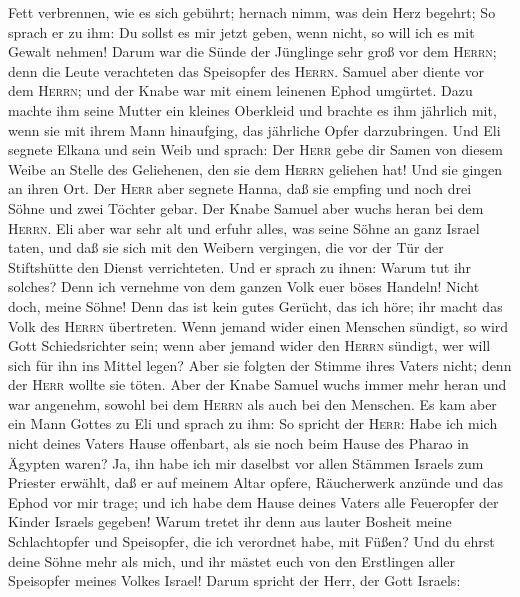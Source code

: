 Fett verbrennen, wie es sich gebührt; hernach nimm, was dein Herz
begehrt; So sprach er zu ihm: Du sollst es mir jetzt geben, wenn nicht,
so will ich es mit Gewalt nehmen!  Darum war die Sünde
der Jünglinge sehr groß vor dem \textsc{Herrn}; denn die Leute
verachteten das Speisopfer des \textsc{Herrn}.  Samuel
aber diente vor dem \textsc{Herrn}; und der Knabe war mit einem leinenen
Ephod umgürtet.  Dazu machte ihm seine Mutter ein kleines
Oberkleid und brachte es ihm jährlich mit, wenn sie mit ihrem Mann
hinaufging, das jährliche Opfer darzubringen.  Und Eli
segnete Elkana und sein Weib und sprach: Der \textsc{Herr} gebe dir
Samen von diesem Weibe an Stelle des Geliehenen, den sie dem
\textsc{Herrn} geliehen hat! Und sie gingen an ihren Ort.
 Der \textsc{Herr} aber segnete Hanna, daß sie empfing
und noch drei Söhne und zwei Töchter gebar. Der Knabe Samuel aber wuchs
heran bei dem \textsc{Herrn}.  Eli aber war sehr alt und
erfuhr alles, was seine Söhne an ganz Israel taten, und daß sie sich mit
den Weibern vergingen, die vor der Tür der Stiftshütte den Dienst
verrichteten.  Und er sprach zu ihnen: Warum tut ihr
solches? Denn ich vernehme von dem ganzen Volk euer böses Handeln!
 Nicht doch, meine Söhne! Denn das ist kein gutes
Gerücht, das ich höre; ihr macht das Volk des \textsc{Herrn} übertreten.
 Wenn jemand wider einen Menschen sündigt, so wird Gott
Schiedsrichter sein; wenn aber jemand wider den \textsc{Herrn} sündigt,
wer will sich für ihn ins Mittel legen? Aber sie folgten der Stimme
ihres Vaters nicht; denn der \textsc{Herr} wollte sie töten.
 Aber der Knabe Samuel wuchs immer mehr heran und war
angenehm, sowohl bei dem \textsc{Herrn} als auch bei den Menschen.
 Es kam aber ein Mann Gottes zu Eli und sprach zu ihm: So
spricht der \textsc{Herr}: Habe ich mich nicht deines Vaters Hause
offenbart, als sie noch beim Hause des Pharao in Ägypten waren?
 Ja, ihn habe ich mir daselbst vor allen Stämmen Israels
zum Priester erwählt, daß er auf meinem Altar opfere, Räucherwerk
anzünde und das Ephod vor mir trage; und ich habe dem Hause deines
Vaters alle Feueropfer der Kinder Israels gegeben!  Warum
tretet ihr denn aus lauter Bosheit meine Schlachtopfer und Speisopfer,
die ich verordnet habe, mit Füßen? Und du ehrst deine Söhne mehr als
mich, und ihr mästet euch von den Erstlingen aller Speisopfer meines
Volkes Israel!  Darum spricht der Herr, der Gott Israels:
